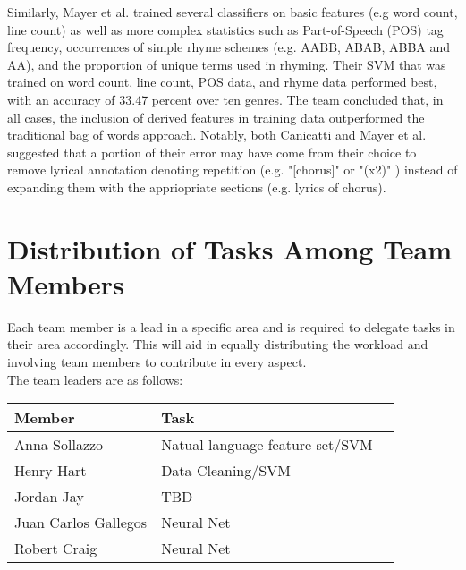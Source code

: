 \documentclass[journal]{IEEEtran}
\begin{document}
Similarly, Mayer et al. \cite{mayer} trained several classifiers on basic features (e.g word count, line count) as well as more complex statistics such as Part-of-Speech (POS) tag frequency, occurrences of simple rhyme schemes (e.g. AABB, ABAB, ABBA and AA), and the proportion of unique terms used in rhyming. Their SVM that was trained on word count, line count, POS data, and rhyme data performed best, with an accuracy of 33.47 percent over ten genres. The team concluded that, in all cases, the inclusion of derived features in training data outperformed the traditional bag of words approach. Notably, both Canicatti and Mayer et al. suggested that a portion of their error may have come from their choice to remove lyrical annotation denoting repetition (e.g. "[chorus]" or "(x2)" ) instead of expanding them with the appriopriate sections (e.g. lyrics of chorus).\par


\section{Distribution of Tasks Among Team Members}

Each team member is a lead in a specific area and is required to delegate tasks in their area accordingly. This will aid in equally distributing the workload and involving team members to contribute in every aspect.\\ 

The team leaders are as follows:

\begin{table}[h!]
    \label{tab:table1}
    \begin{tabular}{l|l|l|}
      \textbf{Member} & \textbf{Task}\\

      \hline
	Anna Sollazzo & Natual language feature set/SVM\\
	Henry Hart & Data Cleaning/SVM\\
	Jordan Jay & TBD\\
	Juan Carlos Gallegos & Neural Net\\
	Robert Craig & Neural Net\\

    \end{tabular}
\end{table}

\newpage
\end{document}
